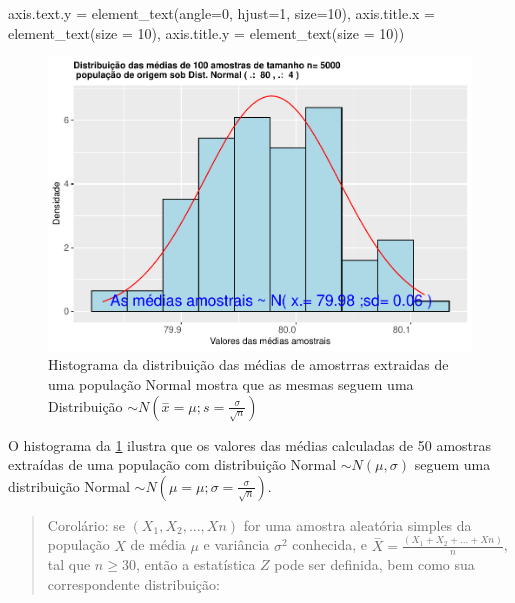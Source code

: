 \documentclass[
]{book}
\newenvironment{Shaded}{\begin{snugshade}}{\end{snugshade}}
\newcommand{\AttributeTok}[1]{\textcolor[rgb]{0.77,0.63,0.00}{#1}}
\newcommand{\DecValTok}[1]{\textcolor[rgb]{0.00,0.00,0.81}{#1}}
\newcommand{\FunctionTok}[1]{\textcolor[rgb]{0.00,0.00,0.00}{#1}}
\newcommand{\NormalTok}[1]{#1}
\begin{document}
\begin{Shaded}
\begin{Highlighting}[]
        \AttributeTok{axis.text.y =} \FunctionTok{element\_text}\NormalTok{(}\AttributeTok{angle=}\DecValTok{0}\NormalTok{, }\AttributeTok{hjust=}\DecValTok{1}\NormalTok{, }\AttributeTok{size=}\DecValTok{10}\NormalTok{),}
        \AttributeTok{axis.title.x =} \FunctionTok{element\_text}\NormalTok{(}\AttributeTok{size =} \DecValTok{10}\NormalTok{),}
        \AttributeTok{axis.title.y =} \FunctionTok{element\_text}\NormalTok{(}\AttributeTok{size =} \DecValTok{10}\NormalTok{))}
\end{Highlighting}
\end{Shaded}

\begin{figure}

{\centering \includegraphics[width=1\linewidth]{apostila_files/figure-latex/fig51-1} 

}

\caption{Histograma da distribuição das médias de amostrras extraidas de uma população  Normal mostra que as mesmas seguem uma Distribuição $\sim N (\stackrel{-}{x}= \mu; s=\frac{\sigma}{\sqrt{n}})$}\label{fig:fig51}
\end{figure}

\hfill\break

O histograma da \ref{fig:fig51} ilustra que os valores das médias calculadas de 50 amostras extraídas de uma população com distribuição Normal \(\sim N (\mu, \sigma)\) seguem uma distribuição Normal \(\sim N (\mu= \mu; \sigma=\frac{\sigma}{\sqrt{n}})\).

\hfill\break

\begin{quote}
Corolário: se \((X_{1}, X_{2},...,X{n})\) for uma amostra aleatória simples da população \(X\) de média \(\mu\) e variância \(\sigma^{2}\) conhecida, e \(\stackrel{-}{X}= \frac{(X_{1}+X_{2}+...+X{n})}{n}\), tal que \(n\ge 30\), então a estatística \(Z\) pode ser definida, bem como sua correspondente distribuição:
\end{quote}
\end{document}
